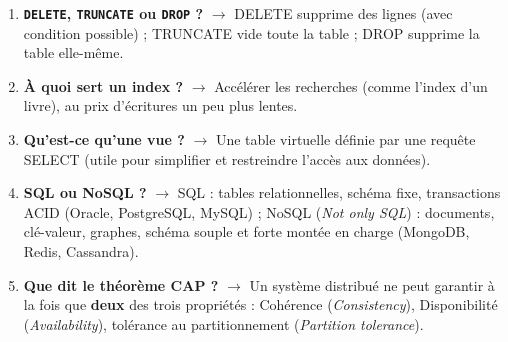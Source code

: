 \begin{enumerate}[leftmargin=*]
    \item \textbf{\texttt{DELETE}, \texttt{TRUNCATE} ou \texttt{DROP} ?} $\rightarrow$ DELETE supprime des lignes (avec condition possible) ; TRUNCATE vide toute la table ; DROP supprime la table elle-même.
    \item \textbf{À quoi sert un index ?} $\rightarrow$ Accélérer les recherches (comme l'index d'un livre), au prix d'écritures un peu plus lentes.
    \item \textbf{Qu'est-ce qu'une vue ?} $\rightarrow$ Une table virtuelle définie par une requête SELECT (utile pour simplifier et restreindre l'accès aux données).
    \item \textbf{SQL ou NoSQL ?} $\rightarrow$ SQL : tables relationnelles, schéma fixe, transactions ACID (Oracle, PostgreSQL, MySQL) ; NoSQL (\textit{Not only SQL}) : documents, clé-valeur, graphes, schéma souple et forte montée en charge (MongoDB, Redis, Cassandra).
    \item \textbf{Que dit le théorème CAP ?} $\rightarrow$ Un système distribué ne peut garantir à la fois que \textbf{deux} des trois propriétés : Cohérence (\textit{Consistency}), Disponibilité (\textit{Availability}), tolérance au partitionnement (\textit{Partition tolerance}).
\end{enumerate}

